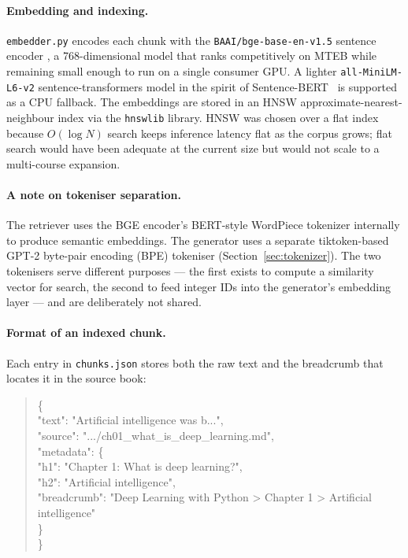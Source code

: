 \paragraph{Embedding and indexing.}
\texttt{embedder.py} encodes each chunk with the \texttt{BAAI/bge-base-en-v1.5} sentence
encoder \cite{xiao2023cpack}, a 768-dimensional model that ranks competitively on MTEB while
remaining small enough to run on a single consumer GPU. A lighter \texttt{all-MiniLM-L6-v2}
sentence-transformers model in the spirit of Sentence-BERT~\cite{reimers2019sentence} is
supported as a CPU fallback. The embeddings are stored in
an HNSW approximate-nearest-neighbour index \cite{malkov2020hnsw} via the \texttt{hnswlib}
library. HNSW was chosen over a flat index because $O(\log N)$ search keeps inference latency
flat as the corpus grows; flat search would have been adequate at the current size but would
not scale to a multi-course expansion.

\paragraph{A note on tokeniser separation.}
The retriever uses the BGE encoder's BERT-style WordPiece tokenizer internally to produce
semantic embeddings. The generator uses a separate tiktoken-based GPT-2 byte-pair encoding
(BPE) tokeniser (Section~\ref{sec:tokenizer}). The two tokenisers serve different purposes
--- the first exists to compute a similarity vector for search, the second to feed integer
IDs into the generator's embedding layer --- and are deliberately not shared.

\paragraph{Format of an indexed chunk.}
Each entry in \texttt{chunks.json} stores both the raw text and the breadcrumb that
locates it in the source book:

\begin{quote}\small\ttfamily
\{ \\
\hspace*{1em}"text": "Artificial intelligence was b...", \\
\hspace*{1em}"source": ".../ch01\_what\_is\_deep\_learning.md", \\
\hspace*{1em}"metadata": \{ \\
\hspace*{2em}"h1": "Chapter 1: What is deep learning?", \\
\hspace*{2em}"h2": "Artificial intelligence", \\
\hspace*{2em}"breadcrumb": "Deep Learning with Python > Chapter 1 > Artificial intelligence" \\
\hspace*{1em}\} \\
\}
\end{quote}
